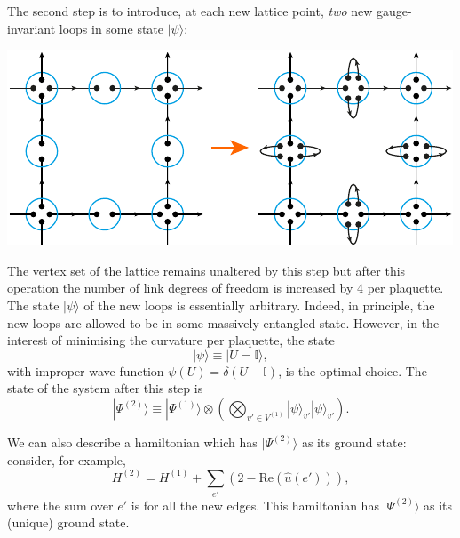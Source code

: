 \documentclass[twocolumn,lengthcheck,superscriptaddress]{revtex4-1}
\theoremstyle{definition}
\theoremstyle{remark}
\begin{document}
The second step is to introduce, at each new lattice point, \emph{two} new gauge-invariant loops in some state $|\psi\rangle$:
\begin{center}
	\includegraphics{qinterp2.pdf}
\end{center} 
The vertex set of the lattice remains unaltered by this step but after this operation the number of link degrees of freedom is increased by $4$ per plaquette. The state $|\psi\rangle$ of the new loops is essentially arbitrary. Indeed, in principle, the new loops are allowed to be in some massively entangled state. However, in the interest of minimising the curvature per plaquette, the state
\begin{equation}
	|\psi\rangle \equiv |U = \mathbb{I}\rangle,
\end{equation} 
with improper wave function $\psi(U) = \delta(U-\mathbb{I})$, is the optimal choice. The state of the system after this step is
\begin{equation}
	|\Psi^{(2)}\rangle \equiv |\Psi^{(1)}\rangle\otimes \left(\bigotimes_{v'\in V^{(1)}}|\psi\rangle_{v'}|\psi\rangle_{v'}\right).
\end{equation}

We can also describe a hamiltonian which has $|\Psi^{(2)}\rangle$ as its ground state: consider, for example,
\begin{equation}
	H^{(2)} = H^{(1)} + \sum_{e'} (2-\text{Re}(\widehat{u}(e'))),
\end{equation}
where the sum over $e'$ is for all the new edges. This hamiltonian has $|\Psi^{(2)}\rangle$ as its (unique) ground state.
\end{document}
